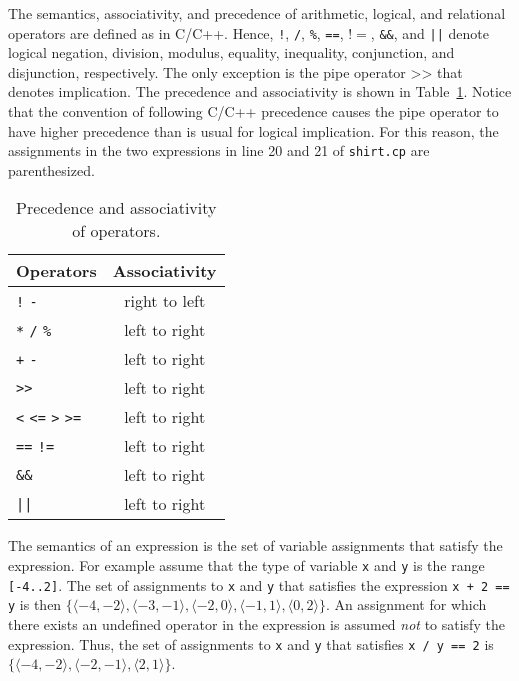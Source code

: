\documentclass{article}
\begin{document}
The semantics, associativity, and precedence of arithmetic, logical,
and relational operators are defined as in C/C++. Hence,
\texttt{!}, \texttt{/}, \texttt{\%}, \texttt{==}, \texttt{$!=$},
\texttt{\&\&}, and \texttt{||} denote logical negation, division, 
modulus, equality, inequality, conjunction, and disjunction,
respectively.  The only exception is the pipe operator $\texttt{>>}$
that denotes implication. The precedence and associativity is shown in
Table~\ref{tbl:pre}. Notice that the convention of following C/C++
precedence causes the pipe operator to have higher precedence than is
usual for logical implication. For this reason, the assignments in the
two expressions in line 20 and 21 of \texttt{shirt.cp} are
parenthesized.
\begin{table}[h!]
\begin{center}
\begin{tabular}{l|c} \hline
Operators & Associativity \\
\hline
\texttt{!} \texttt{-}                         & right to left \\
\texttt{*} \texttt{/} \texttt{\%}             & left to right \\
\texttt{+} \texttt{-}                         & left to right \\        
\texttt{>>}                                   & left to right \\
\texttt{<} \texttt{<=} \texttt{>} \texttt{>=} & left to right \\
\texttt{==} \texttt{!=}                       & left to right \\
\texttt{\&\&}                                 & left to right \\
\texttt{||}                                   & left to right \\ 
\hline
\end{tabular}
\caption{\label{tbl:pre}Precedence and associativity of operators.}
\end{center}
\end{table}

The semantics of an expression is the set of variable assignments that
satisfy the expression. For example assume that the type of variable
\texttt{x} and \texttt{y} is the range
\texttt{[-4..2]}. The set of assignments to \texttt{x} and \texttt{y} that satisfies the
expression \texttt{x + 2 == y} is then $\{ \langle -4,-2 \rangle, \langle -3 , -1  \rangle,
\langle -2, 0  \rangle, \langle -1, 1  \rangle,\langle 0,2  \rangle \}$.
An assignment for which there exists an undefined operator in the expression
is assumed {\em not} to satisfy the expression. Thus, the set of assignments to 
\texttt{x} and \texttt{y} that satisfies \texttt{x / y == 2} is
$\{ \langle -4,-2 \rangle, \langle -2 , -1  \rangle, \langle 2, 1  \rangle \}$.
\end{document}
